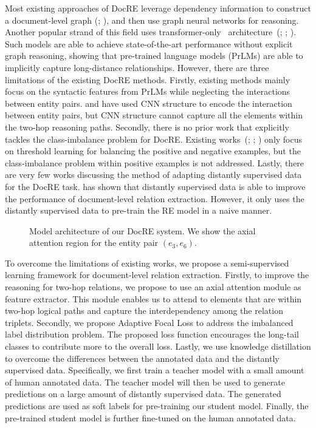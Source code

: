 \documentclass[11pt]{article}
\begin{document}
Most existing approaches of DocRE leverage dependency information to construct a document-level graph (\citealp{zeng2021sire}; \citealp{zeng2020double}), and then use graph neural networks for reasoning. Another popular strand of this field uses transformer-only~\citep{vaswani2017attention} architecture~(\citealp{zhou2021document}; \citealp{xu2021entity}; \citealp{zhang2021document}). Such models are able to achieve state-of-the-art performance without explicit graph reasoning, showing that pre-trained language models (PrLMs) are able to implicitly capture long-distance relationships.  However, there are three limitations of the existing DocRE methods. Firstly, existing methods mainly focus on the syntactic features from PrLMs while neglecting the interactions between entity pairs. \citet{zhang2021document} and \citet{li2021mrn} have used CNN structure to encode the interaction between entity pairs, but CNN structure cannot capture all the elements within the two-hop reasoning paths. Secondly, there is no prior work that explicitly tackles the class-imbalance problem for DocRE. Existing works~(\citealp{zhou2021document}; \citealp{zhang2021document}; \citealp{zeng2020double}) only focus on threshold learning for balancing the positive and negative examples, but the class-imbalance problem within positive examples is not addressed. Lastly, there are very few works discussing the method of adapting distantly supervised data for the DocRE task. \citet{xu2021entity} has shown that distantly supervised data is able to improve the performance of document-level relation extraction. However, it only uses the distantly supervised data to pre-train the RE model in a naive manner.
\begin{figure*}
    \centering
    \setlength{\abovecaptionskip}{0pt} 
    \captionsetup{margin=2.5em}
    \caption{Model architecture of our DocRE system. We show the axial attention region for the entity pair $(e_3, e_6)$.}
    \label{fig:model-architecture}
    
\end{figure*}


To overcome the limitations of existing works, we propose a semi-supervised learning framework for document-level relation extraction. Firstly, to improve the reasoning for two-hop relations, we propose to use an axial attention module as feature extractor. This module enables us to attend to elements that are within two-hop logical paths and capture the interdependency among the relation triplets. Secondly, we propose Adaptive Focal Loss to address the imbalanced label distribution problem. The proposed loss function encourages the long-tail classes to contribute more to the overall loss. Lastly, we use knowledge distillation to overcome the differences between the annotated data and the distantly supervised data. Specifically, we first train a teacher model with a small amount of human annotated data. The teacher model will then be used to generate predictions on a large amount of distantly supervised data. The generated predictions are used as soft labels for pre-training our student model. Finally, the pre-trained student model is further fine-tuned on the human annotated data.
\end{document}

